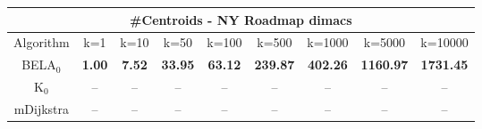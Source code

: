 \begin{tabular}{c|cccccccc}\toprule
\multicolumn{9}{c}{#Centroids - NY Roadmap dimacs}\\ \midrule
Algorithm & k=1 & k=10 & k=50 & k=100 & k=500 & k=1000 & k=5000 & k=10000 \\ \midrule
BELA$_0$ & \textbf{1.00} & \textbf{7.52} & \textbf{33.95} & \textbf{63.12} & \textbf{239.87} & \textbf{402.26} & \textbf{1160.97} & \textbf{1731.45} \\
K$_0$ & -- & -- & -- & -- & -- & -- & -- & -- \\
mDijkstra & -- & -- & -- & -- & -- & -- & -- & -- \\ \bottomrule 
\end{tabular}
